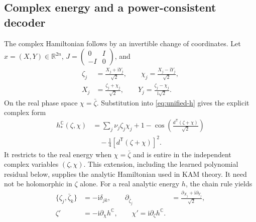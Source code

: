 \subsection{Complex energy and a power-consistent decoder}
\label{sec:core-complex-decoder}
The complex Hamiltonian follows by an invertible change of coordinates.
Let $x=(X,Y)\in\mathbb R^{2n}$,
$J=\left(\begin{smallmatrix}0&I\\-I&0\end{smallmatrix}\right)$, and
\begin{align}
 \zeta_j&=\frac{X_j+\mathrm iY_j}{\sqrt2},\qquad
 \chi_j=\frac{X_j-\mathrm iY_j}{\sqrt2},\nonumber\\
 X_j&=\frac{\zeta_j+\chi_j}{\sqrt2},\qquad
 Y_j=\frac{\zeta_j-\chi_j}{\mathrm i\sqrt2}.
 \label{eq:core-complex-chart}
\end{align}
On the real phase space $\chi=\bar\zeta$. Substitution into
\eqref{eq:unified-h} gives the explicit complex form
\begin{align}
 h_*^{\mathbb C}(\zeta,\chi)
 &=\sum_j\nu_j\zeta_j\chi_j
   +1-\cos\!\left(\frac{d^{\mathsf T}(\zeta+\chi)}{\sqrt2}\right)\nonumber\\
 &\quad-\tfrac14[d^{\mathsf T}(\zeta+\chi)]^2.
 \label{eq:core-complex-energy}
\end{align}
It restricts to the real energy when $\chi=\bar\zeta$ and is entire
in the independent complex variables $(\zeta,\chi)$. This extension,
including the learned polynomial residual below, supplies the analytic
Hamiltonian used in KAM theory. It need not be holomorphic in $\zeta$
alone. For a real analytic energy $h$, the chain rule yields
\begin{align}
 \{\zeta_j,\bar\zeta_k\}&=-\mathrm i\delta_{jk},\qquad
 \partial_{\bar\zeta_j}&=
       \frac{\partial_{X_j}+\mathrm i\partial_{Y_j}}{\sqrt2},\nonumber\\
 \zeta'&=-\mathrm i\partial_\chi h^{\mathbb C},\qquad
 \chi'=\mathrm i\partial_\zeta h^{\mathbb C}.
 \label{eq:core-complex-canonical}
\end{align}

